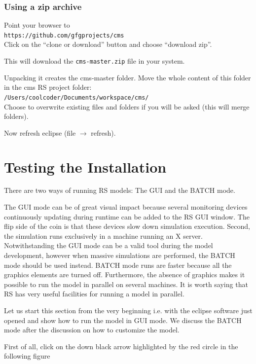 \documentclass{article}
\begin{document}
\vskip2mm

\subsubsection{Using a zip archive}

Point your browser to\\ 
\verb+https://github.com/gfgprojects/cms+\\
Click on the ``clone or download'' button and choose ``download zip''.

This will download the \verb+cms-master.zip+ file in your system.

Unpacking it creates the cms-master folder.
Move the whole content of this folder in the cms RS project folder:\\  
\verb+/Users/coolcoder/Documents/workspace/cms/+\\
Choose to overwrite existing files and folders if you will be asked (this will merge folders). 

Now refresh eclipse (file $\rightarrow$ refresh).



\section{Testing the Installation}


There are two ways of running RS models: The GUI and the BATCH mode.

The GUI mode can be of great visual impact because several monitoring devices continuously updating during runtime can be added to the RS GUI window. The flip side of the coin is that these devices slow down simulation execution. Second, the simulation runs exclusively in a machine running an X server. Notwithstanding the GUI mode can be a valid tool during the model development, however when massive simulations are performed, the BATCH mode should be used instead. BATCH mode runs are faster because all the graphics elements are turned off. Furthermore, the absence of graphics makes it possible to run the model in parallel on several machines. It is worth saying that RS has very useful facilities for running a model in parallel.


Let us start this section from the very beginning i.e. with the eclipse software just opened and show how to run the model in GUI mode. 
We discuss the BATCH mode after the discussion on how to customize the model.

First of all, click on the down black arrow highlighted by the red circle in the following figure
\end{document}
